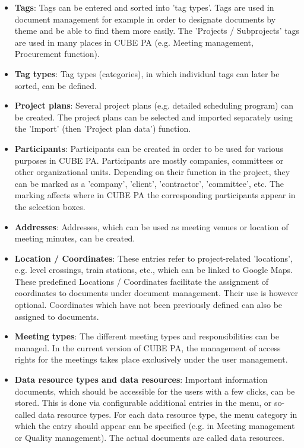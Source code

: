 \begin{itemize}
\item
\textbf{Tags}: Tags can be entered and sorted into 'tag types'. Tags are used in document management for example in order to designate documents by theme and be able to find them more easily. 
The 'Projects / Subprojects' tags are used in many places in CUBE PA (e.g. Meeting management, Procurement function).
\item
\textbf{Tag types}: Tag types (categories), in which individual tags can later be sorted, 
can be defined.
\item
\textbf{Project plans}: Several project plans (e.g. detailed scheduling program) can be created. The project plans can be selected and imported separately using the 'Import' (then 'Project plan data') function.
\item
\textbf{Participants}: Participants can be created in order to be used for various purposes in CUBE PA. Participants are mostly companies, committees or other organizational units. Depending on their function in the project, they can be marked as a 'company', 'client', 'contractor', 'committee', etc. The marking affects where in CUBE PA the corresponding participants appear in the selection boxes.
\item
\textbf{Addresses}: Addresses, which can be used as meeting venues or location of meeting minutes, can be created.
\item
\textbf{Location / Coordinates}: These entries refer to project-related 'locations', e.g. level crossings, train stations, etc., which can be linked to Google Maps. These predefined Locations / Coordinates facilitate the assignment of coordinates to documents under document management. Their use is however optional. Coordinates which have not been previously defined can also be assigned to documents.
\item
\textbf{Meeting types}: The different meeting types and responsibilities can be managed. In the current version of CUBE PA, the management of access rights for the meetings takes place exclusively under the user management.
\item
\textbf{Data resource types and data resources}: Important information documents, which should be accessible for the users with a few clicks, can be stored. This is done via configurable additional entries in the menu, or so-called data resource types. For each data resource type, the menu category in which the entry should appear can be specified (e.g. in Meeting management or Quality management). The actual documents are called data resources. 

\end{itemize}
